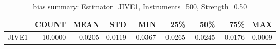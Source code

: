 \begin{table}[ht]
\centering
\caption{bias summary: Estimator=JIVE1, Instruments=500, Strength=0.50}
\begin{tabular}{lrrrrrrrr}
\toprule
 & COUNT & MEAN & STD & MIN & 25\% & 50\% & 75\% & MAX \\
\midrule
JIVE1 & 10.0000 & -0.0205 & 0.0119 & -0.0367 & -0.0265 & -0.0245 & -0.0176 & 0.0009 \\
\bottomrule
\end{tabular}
\end{table}
